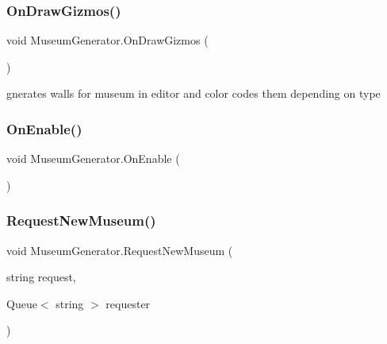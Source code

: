 \subsubsection{\texorpdfstring{On\+Draw\+Gizmos()}{OnDrawGizmos()}}
{\footnotesize\ttfamily void Museum\+Generator.\+On\+Draw\+Gizmos (\begin{DoxyParamCaption}{ }\end{DoxyParamCaption})\hspace{0.3cm}{\ttfamily [private]}}



gnerates walls for museum in editor and color codes them depending on type 

\mbox{\label{class_museum_generator_abc3127d3a23107a350064fc49c5495c1}} 
\subsubsection{\texorpdfstring{On\+Enable()}{OnEnable()}}
{\footnotesize\ttfamily void Museum\+Generator.\+On\+Enable (\begin{DoxyParamCaption}{ }\end{DoxyParamCaption})\hspace{0.3cm}{\ttfamily [private]}}

\mbox{\label{class_museum_generator_a5ead852effaa81309fe98b4d61fe9759}} 
\subsubsection{\texorpdfstring{Request\+New\+Museum()}{RequestNewMuseum()}}
{\footnotesize\ttfamily void Museum\+Generator.\+Request\+New\+Museum (\begin{DoxyParamCaption}\item[{string}]{request,  }\item[{Queue$<$ string $>$}]{requester }\end{DoxyParamCaption})}

